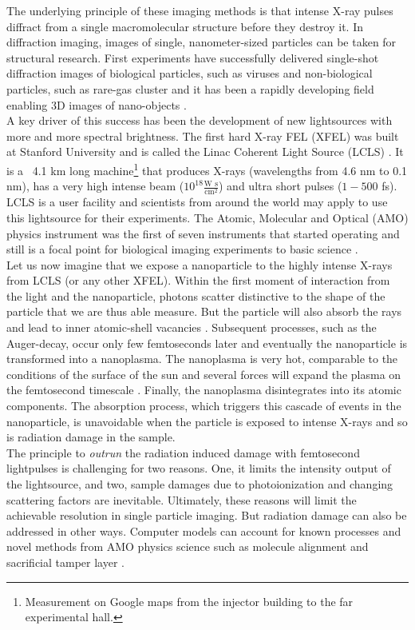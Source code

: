 %
The underlying principle of these imaging methods is that intense X-ray pulses diffract from a single macromolecular structure before they destroy it. In diffraction imaging, images of single, nanometer-sized particles can be taken for structural research. First experiments have successfully delivered single-shot diffraction images of biological particles, such as viruses \citep{Seibert-2011-Nature} and non-biological particles, such as rare-gas cluster \citep{Gomez-2014-Science} and it has been a rapidly developing field enabling 3D images of nano-objects \citep{Ekeberg-2015-PRL,Barke-2015-NatComm}.\\
%
A key driver of this success has been the development of new lightsources with more and more spectral brightness. The first hard X-ray FEL (XFEL) was built at Stanford University and is called the Linac Coherent Light Source (LCLS) \citep{Emma-2010-NatPho}. It is a ~4.1 km long machine\footnote{Measurement on Google maps from the injector building to the far experimental hall.} that produces X-rays (wavelengths from 4.6 nm to 0.1 nm), has a very high intense beam ($10^{18} \tfrac{\text{W s}}{\text{cm}^{2}}$) and ultra short pulses ($1-500$ fs). LCLS is a user facility and scientists from around the world may apply to use this lightsource for their experiments. The Atomic, Molecular and Optical (AMO) physics instrument was the first of seven instruments that started operating and still is a focal point for biological imaging experiments to basic science \citep{Bostedt-2016-RMP}.\\
%
Let us now imagine that we expose a nanoparticle to the highly intense X-rays from LCLS (or any other XFEL). Within the first moment of interaction from the light and the nanoparticle, photons scatter distinctive to the shape of the particle that we are thus able measure. But the particle will also absorb the rays and lead to inner atomic-shell vacancies \citep{Young-2010-Nature}. Subsequent processes, such as the Auger-decay, occur only few femtoseconds later and eventually the nanoparticle is transformed into a nanoplasma. The nanoplasma is very hot, comparable to the conditions of the surface of the sun and several forces will expand the plasma on the femtosecond timescale \citep{Gorkhover-2016-NatPho}. Finally, the nanoplasma disintegrates into its atomic components. The absorption process, which triggers this cascade of events in the nanoparticle, is unavoidable when the particle is exposed to intense X-rays and so is radiation damage in the sample.\\
%
The principle to \textit{outrun} the radiation induced damage with femtosecond lightpulses is challenging for two reasons. One, it limits the intensity output of the lightsource, and two, sample damages due to photoionization and changing scattering factors are inevitable. Ultimately, these reasons will limit the achievable resolution in single particle imaging. But radiation damage can also be addressed in other ways. Computer models can account for known processes \citep{Quiney-2010-NatPhys} and novel methods from AMO physics science such as molecule alignment \citep{Kupper-2014-PRL} and sacrificial tamper layer \citep{Hau-Riege-2004-PRE,Hau-Riege-2010-PRL}.%

